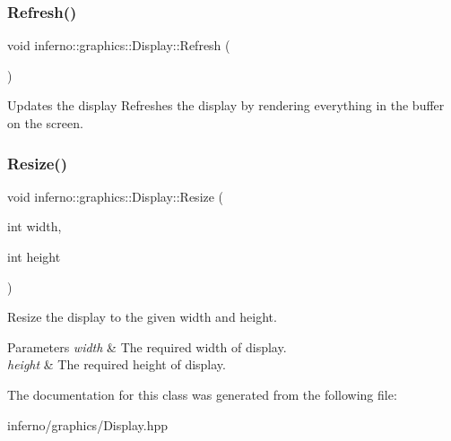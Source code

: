 \subsubsection{\texorpdfstring{Refresh()}{Refresh()}}
{\footnotesize\ttfamily void inferno\+::graphics\+::\+Display\+::\+Refresh (\begin{DoxyParamCaption}{ }\end{DoxyParamCaption})\hspace{0.3cm}{\ttfamily [inline]}}



Updates the display Refreshes the display by rendering everything in the buffer on the screen. 

\mbox{\label{classinferno_1_1graphics_1_1_display_abb7ee350b8273145d1b9a4e5c3c73b58}} 
\subsubsection{\texorpdfstring{Resize()}{Resize()}}
{\footnotesize\ttfamily void inferno\+::graphics\+::\+Display\+::\+Resize (\begin{DoxyParamCaption}\item[{int}]{width,  }\item[{int}]{height }\end{DoxyParamCaption})\hspace{0.3cm}{\ttfamily [inline]}}



Resize the display to the given width and height. 


\begin{DoxyParams}{Parameters}
{\em width} & The required width of display. \\
\hline
{\em height} & The required height of display. \\
\hline
\end{DoxyParams}


The documentation for this class was generated from the following file\+:\begin{DoxyCompactItemize}
\item 
inferno/graphics/Display.\+hpp\end{DoxyCompactItemize}

